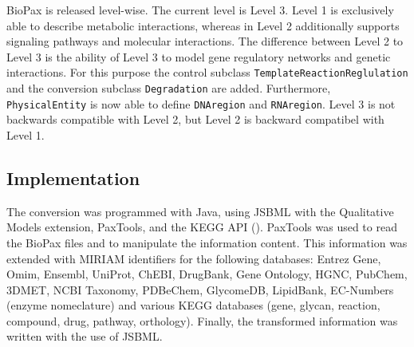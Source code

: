 \documentclass{bioinfo}
\begin{document}
\begin{methods}
BioPax is released level-wise.
The current level is Level 3.
Level 1 is exclusively able to describe metabolic interactions, whereas in Level 2 additionally supports signaling pathways and molecular interactions.
The difference between Level 2 to Level 3 is the ability of Level 3 to model gene regulatory networks and genetic interactions.
For this purpose the control subclass \texttt{TemplateReactionReglulation} and the conversion subclass \texttt{Degradation} are added.
Furthermore, \texttt{PhysicalEntity} is now able to define \texttt{DNAregion} and \texttt{RNAregion}.
Level 3 is not backwards compatible with Level 2, but Level 2 is backward compatibel with Level 1. \citep{Demir2010}
\subsection{Implementation}
The conversion was programmed with Java, using JSBML \citep{Draeger2011} with the Qualitative Models extension, PaxTools, and the KEGG API (\citep{Kanehisa2006}).
PaxTools was used to read the BioPax files and to manipulate the information content.
This information was extended with MIRIAM identifiers for the following databases: Entrez Gene, Omim, Ensembl, UniProt, ChEBI, DrugBank, Gene Ontology, HGNC, PubChem, 3DMET, NCBI Taxonomy, PDBeChem, GlycomeDB, LipidBank, EC-Numbers (enzyme nomeclature) and various KEGG databases (gene, glycan, reaction, compound, drug, pathway, orthology).
Finally, the transformed information was written with the use of JSBML.


\end{methods}
\end{document}
